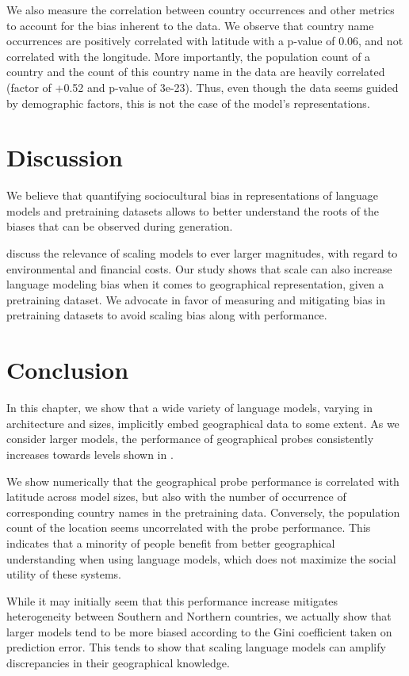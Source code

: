 We also measure the correlation between country occurrences and other metrics to account for the bias inherent to the data. We observe that country name occurrences are positively correlated with latitude with a p-value of 0.06, and not correlated with the longitude. More importantly, the population count of a country and the count of this country name in the data are heavily correlated (factor of +0.52 and p-value of 3e-23). Thus, even though the data seems guided by demographic factors, this is not the case of the model's representations.

\section{Discussion}
\label{sec:discussion_geo}
We believe that quantifying sociocultural bias in representations of language models and pretraining datasets allows to better understand the roots of the biases that can be observed during generation.

\citet{parrots_bender} discuss the relevance of scaling models to ever larger magnitudes, with regard to environmental and financial costs. Our study shows that scale can also increase language modeling bias when it comes to geographical representation, given a pretraining dataset. We advocate in favor of measuring and mitigating bias in pretraining datasets to avoid scaling bias along with performance.

\section*{Conclusion}
In this chapter, we show that a wide variety of language models, varying in architecture and sizes, implicitly embed geographical data to some extent. As we consider larger models, the performance of geographical probes consistently increases towards levels shown in \citet{gurnee2023language}.

We show numerically that the geographical probe performance is correlated with latitude across model sizes, but also with the number of occurrence of corresponding country names in the pretraining data. Conversely, the population count of the location seems uncorrelated with the probe performance. This indicates that a minority of people benefit from better geographical understanding when using language models, which does not maximize the social utility of these systems.

While it may initially seem that this performance increase mitigates heterogeneity between Southern and Northern countries, we actually show that larger models tend to be more biased according to the Gini coefficient taken on prediction error. This tends to show that scaling language models can amplify discrepancies in their geographical knowledge.


